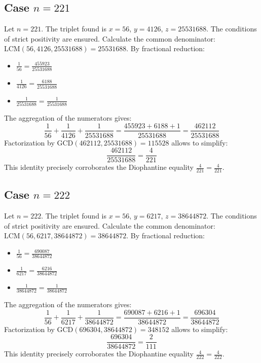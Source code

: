 \documentclass[11pt,a4paper]{article}
\begin{document}
\subsection{Case $n = 221$}
Let $n = 221$. The triplet found is $x = 56$, $y = 4126$, $z = 25531688$.
The conditions of strict positivity are ensured.
Calculate the common denominator: $\text{LCM}(56, 4126, 25531688) = 25531688$.
By fractional reduction:
\begin{itemize}
    \item $\frac{1}{56} = \frac{455923}{25531688}$
    \item $\frac{1}{4126} = \frac{6188}{25531688}$
    \item $\frac{1}{25531688} = \frac{1}{25531688}$
\end{itemize}
The aggregation of the numerators gives:
$$ \frac{1}{56} + \frac{1}{4126} + \frac{1}{25531688} = \frac{455923 + 6188 + 1}{25531688} = \frac{462112}{25531688} $$
Factorization by $\text{GCD}(462112, 25531688) = 115528$ allows to simplify:
$$ \frac{462112}{25531688} = \frac{4}{221} $$
This identity precisely corroborates the Diophantine equality $\frac{4}{221} = \frac{4}{221}$.

\subsection{Case $n = 222$}
Let $n = 222$. The triplet found is $x = 56$, $y = 6217$, $z = 38644872$.
The conditions of strict positivity are ensured.
Calculate the common denominator: $\text{LCM}(56, 6217, 38644872) = 38644872$.
By fractional reduction:
\begin{itemize}
    \item $\frac{1}{56} = \frac{690087}{38644872}$
    \item $\frac{1}{6217} = \frac{6216}{38644872}$
    \item $\frac{1}{38644872} = \frac{1}{38644872}$
\end{itemize}
The aggregation of the numerators gives:
$$ \frac{1}{56} + \frac{1}{6217} + \frac{1}{38644872} = \frac{690087 + 6216 + 1}{38644872} = \frac{696304}{38644872} $$
Factorization by $\text{GCD}(696304, 38644872) = 348152$ allows to simplify:
$$ \frac{696304}{38644872} = \frac{2}{111} $$
This identity precisely corroborates the Diophantine equality $\frac{4}{222} = \frac{4}{222}$.
\end{document}
